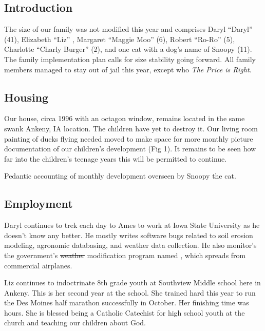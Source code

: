 \documentclass[letterpaper,11pt]{article}
\makeatletter
\newenvironment{figurehere}
  {\def\@captype{figure}}
  {}
\makeatother
\begin{document}
\begin{multicols}{2}

    
\section{Introduction} 

The size of our family was not modified this year and comprises Daryl
\enquote{Daryl} (41), Elizabeth \enquote{Liz} ,
Margaret \enquote{Maggie Moo} (6), Robert \enquote{Ro-Ro} (5), Charlotte
 \enquote{Charly Burger} (2), and one cat with a dog's name of Snoopy (11). 
The family implementation plan calls for size stability going forward.  All
family members managed to stay out of jail this year, except 
who  
\textit{The Price is Right}. 

   
\subsection{Housing}

Our house, circa 1996 with an octagon window, remains located in the same
swank Ankeny, IA location.  The children have yet to destroy it. Our living
room painting of ducks flying needed moved to make space for more monthly
picture documentation of our children's development (Fig 1).  It remains to
be seen how far into the children's teenage years this will be permitted
to continue.

\bigskip

\begin{figurehere}
    \centering   
    \caption{Pedantic accounting of monthly development overseen by Snoopy the cat.}
   \end{figurehere}


\subsection{Employment}

Daryl continues to trek each day to Ames to work at Iowa State University as
he doesn't know any better.  He mostly writes software bugs 
related to soil erosion modeling, agronomic databasing, and weather data
collection.  He also monitor's the government's \sout{weather} modification program
named , which spreads  from commercial
airplanes.

Liz continues to indoctrinate 8th grade youth at Southview Middle school
here in Ankeny.  This is her second year at the school.  She trained hard this
year to run the Des Moines half marathon successfully in October.  Her finishing
time was  hours. She is blessed
being a Catholic Catechist for high school youth at the church and teaching our
children about God.


\end{multicols}
\end{document}
